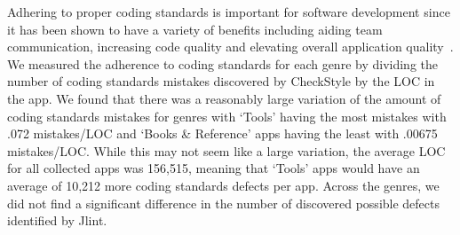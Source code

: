 \documentclass{sig-alternate}
\begin{document}
\begin{table}
\begin{center}
\begin{tabular}{ | l | c | c | c | c | c |  c |}

	
  \end{tabular}
  \end{center}
\end{table}


Adhering to proper coding standards is important for software development since it has been shown to have a variety of benefits including aiding team communication, increasing code quality and elevating overall application quality~\cite{Li:2005:ETC:1095714.1095770}. We measured the adherence to coding standards for each genre by dividing the number of coding standards mistakes discovered by CheckStyle by the LOC in the app. We found that there was a reasonably large variation of the amount of coding standards mistakes for genres with `Tools' having the most mistakes with .072 mistakes/LOC and `Books \& Reference' apps having the least with .00675 mistakes/LOC. While this may not seem like a large variation, the average LOC for all collected apps was 156,515, meaning that `Tools' apps would have an average of 10,212 more coding standards defects per app. Across the genres, we did not find a significant difference in the number of discovered possible defects identified by Jlint.
\end{document}
